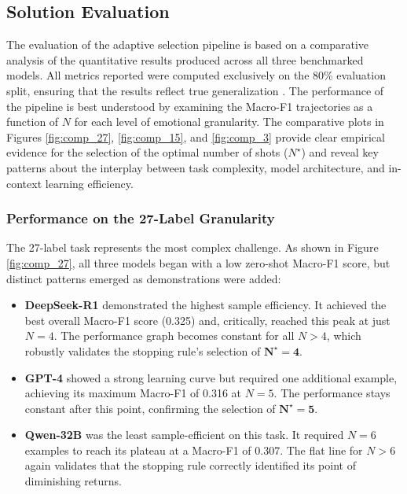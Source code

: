 \subsection{Solution Evaluation}

The evaluation of the adaptive selection pipeline is based on a comparative analysis of the quantitative results produced across all three benchmarked models. All metrics reported were computed exclusively on the 80\% evaluation split, ensuring that the results reflect true generalization \cite{demszky2020goemotions}. The performance of the pipeline is best understood by examining the Macro-F1 trajectories as a function of $N$ for each level of emotional granularity. The comparative plots in Figures \ref{fig:comp_27}, \ref{fig:comp_15}, and \ref{fig:comp_3} provide clear empirical evidence for the selection of the optimal number of shots ($N^{\star}$) and reveal key patterns about the interplay between task complexity, model architecture, and in-context learning efficiency.

\subsubsection{Performance on the 27-Label Granularity}

The 27-label task represents the most complex challenge. As shown in Figure \ref{fig:comp_27}, all three models began with a low zero-shot Macro-F1 score, but distinct patterns emerged as demonstrations were added:
\begin{itemize}
    \item \textbf{DeepSeek-R1} demonstrated the highest sample efficiency. It achieved the best overall Macro-F1 score (0.325) and, critically, reached this peak at just $N=4$. The performance graph becomes constant for all $N>4$, which robustly validates the stopping rule's selection of $\mathbf{N^{\star} = 4}$.
    \item \textbf{GPT-4} showed a strong learning curve but required one additional example, achieving its maximum Macro-F1 of 0.316 at $N=5$. The performance stays constant after this point, confirming the selection of $\mathbf{N^{\star} = 5}$.
    \item \textbf{Qwen-32B} was the least sample-efficient on this task. It required $N=6$ examples to reach its plateau at a Macro-F1 of 0.307. The flat line for $N>6$ again validates that the stopping rule correctly identified its point of diminishing returns.
\end{itemize}

